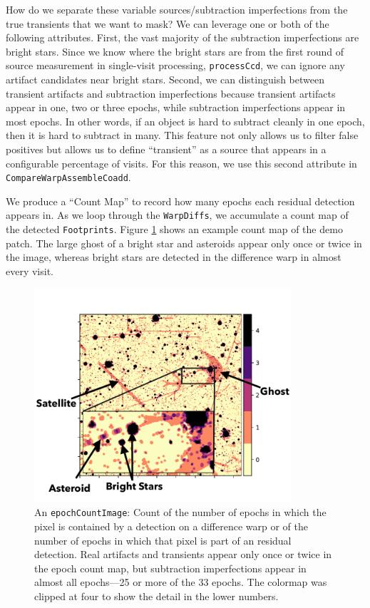 \documentclass[DM,authoryear,toc]{lsstdoc}
\begin{document}
How do we separate these variable sources/subtraction imperfections from the true transients that we want to mask?
We can leverage one or both of the following attributes.
First, the vast majority of the subtraction imperfections are bright stars.
Since we know where the bright stars are from the first round of source measurement in single-visit processing, \texttt{processCcd}, we can ignore any artifact candidates near bright stars.
Second, we can distinguish between transient artifacts and subtraction imperfections because transient artifacts appear in one, two or three epochs, while subtraction imperfections appear in most epochs.
In other words, if an object is hard to subtract cleanly in one epoch, then it is hard to subtract in many.
This feature not only allows us to filter false positives but allows us to define ``transient'' as a source that appears in a configurable percentage of visits.
For this reason,  we use this second attribute in \texttt{CompareWarpAssembleCoadd}.

We produce a ``Count Map'' to record how many epochs each residual detection appears in.
As we loop through the  \texttt{WarpDiffs}, we accumulate a count map of the detected \texttt{Footprints}.
Figure \ref{fig:countMap} shows an example count map of the demo patch.
The large ghost of a bright star and asteroids appear only once or twice in the image, whereas bright stars are detected in the difference warp in almost every visit.

\begin{figure}
\begin{centering}
\includegraphics[width=0.85\textwidth]{figures/AnnotatedEpochCountImage.pdf}
\par\end{centering}
\caption{\label{fig:countMap} An \texttt{epochCountImage}:  Count of the number of epochs in which the  pixel is contained by a detection on a difference warp or of the number of epochs in which that pixel is part of an residual detection.  Real artifacts and transients appear only once or twice in the epoch count map, but subtraction imperfections appear in almost all epochs---25 or more of the 33 epochs.  The colormap was clipped at four to show the detail in the lower numbers. }
\end{figure}
\end{document}
